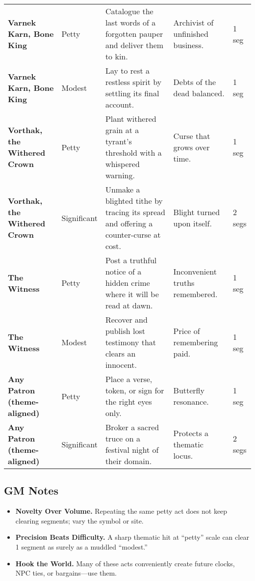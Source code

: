 \begin{table}[h]
\begin{tabularx}{\linewidth}{>{\bfseries}l l X X l}
Varnek Karn, Bone King & Petty & Catalogue the last words of a forgotten pauper and deliver them to kin. & Archivist of unfinished business. & 1 seg \\
Varnek Karn, Bone King & Modest & Lay to rest a restless spirit by settling its final account. & Debts of the dead balanced. & 1 seg \\
Vorthak, the Withered Crown & Petty & Plant withered grain at a tyrant's threshold with a whispered warning. & Curse that grows over time. & 1 seg \\
Vorthak, the Withered Crown & Significant & Unmake a blighted tithe by tracing its spread and offering a counter-curse at cost. & Blight turned upon itself. & 2 segs \\
The Witness & Petty & Post a truthful notice of a hidden crime where it will be read at dawn. & Inconvenient truths remembered. & 1 seg \\
The Witness & Modest & Recover and publish lost testimony that clears an innocent. & Price of remembering paid. & 1 seg \\
Any Patron (theme-aligned) & Petty & Place a verse, token, or sign for the right eyes only. & Butterfly resonance. & 1 seg \\
Any Patron (theme-aligned) & Significant & Broker a sacred truce on a festival night of their domain. & Protects a thematic locus. & 2 segs \\
\bottomrule
\end{tabularx}
\end{table}

\subsection*{GM Notes}\label{subsec:acts-service-gm}
\begin{itemize}
\item \textbf{Novelty Over Volume.} Repeating the same petty act does not keep clearing segments; vary the symbol or site.
\item \textbf{Precision Beats Difficulty.} A sharp thematic hit at ``petty'' scale can clear 1 segment as surely as a muddled ``modest.''
\item \textbf{Hook the World.} Many of these acts conveniently create future clocks, NPC ties, or bargains---use them.
\end{itemize}

